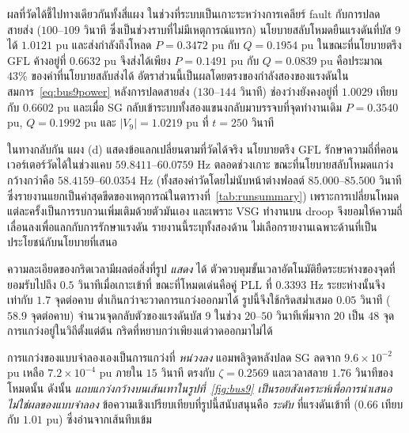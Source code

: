 \documentclass[12pt,a4paper]{article}
\begin{document}
ผลที่วัดได้ชี้ไปทางเดียวกันทั้งสี่แผง ในช่วงที่ระบบเป็นเกาะระหว่างการเคลียร์ fault กับการปลดสายส่ง ($100$--$109$ วินาที ซึ่งเป็นช่วงราบที่ไม่มีเหตุการณ์แทรก) นโยบายสลับโหมดยืนแรงดันที่บัส 9 ได้ $1.0121$ pu และส่งกำลังถึงโหลด $P=0.3472$ pu กับ $Q=0.1954$ pu ในขณะที่นโยบายตรึง GFL ค้างอยู่ที่ $0.6632$ pu จึงส่งได้เพียง $P=0.1491$ pu กับ $Q=0.0839$ pu คือประมาณ $43\%$ ของค่าที่นโยบายสลับส่งได้ อัตราส่วนนี้เป็นผลโดยตรงของกำลังสองของแรงดันในสมการ~\eqref{eq:bus9power} หลังการปลดสายส่ง ($130$--$144$ วินาที) ช่องว่างยังคงอยู่ที่ $1.0029$ เทียบกับ $0.6602$ pu และเมื่อ SG กลับเข้าระบบทั้งสองแขนงกลับมาบรรจบที่จุดทำงานเดิม $P=0.3540$ pu, $Q=0.1992$ pu และ $|V_9|=1.0219$ pu ที่ $t=250$ วินาที

ในทางกลับกัน แผง (d) แสดงข้อแลกเปลี่ยนตามที่วัดได้จริง นโยบายตรึง GFL รักษาความถี่ที่คอนเวอร์เตอร์วัดได้ในช่วงแคบ $59.8411$--$60.0759$ Hz ตลอดช่วงเกาะ ขณะที่นโยบายสลับโหมดแกว่งกว้างกว่าคือ $58.4159$--$60.0354$ Hz (ทั้งสองค่าวัดโดยไม่นับหน้าต่างฟอลต์ $85.000$--$85.500$ วินาที ซึ่งรายงานแยกเป็นค่าสุดขีดของเหตุการณ์ในตารางที่~\ref{tab:runsummary}) เพราะการเปลี่ยนโหมดแต่ละครั้งเป็นการรบกวนเพิ่มเติมด้วยตัวมันเอง และเพราะ VSG ทำงานบน droop จึงยอมให้ความถี่เลื่อนลงเพื่อแลกกับการรักษาแรงดัน รายงานนี้ระบุทั้งสองด้าน ไม่เลือกรายงานเฉพาะด้านที่เป็นประโยชน์กับนโยบายที่เสนอ


ความละเอียดของกริดเวลามีผลต่อสิ่งที่รูป \emph{แสดง} ได้ ตัวควบคุมขั้นเวลาอัตโนมัติยืดระยะห่างของจุดที่ยอมรับไปถึง $0.5$ วินาทีเมื่อเกาะเข้าที่ ขณะที่โหมดเด่นคือคู่ PLL ที่ $0.3393$ Hz ระยะห่างนั้นจึงเท่ากับ $1.7$ จุดต่อคาบ ต่ำเกินกว่าจะวาดการแกว่งออกมาได้ รูปนี้จึงใช้กริดสม่ำเสมอ $0.05$ วินาที ($58.9$ จุดต่อคาบ) จำนวนจุดกลับตัวของแรงดันบัส 9 ในช่วง $20$--$50$ วินาทีเพิ่มจาก $20$ เป็น $48$ จุด การแกว่งอยู่ในวิถีตั้งแต่ต้น กริดที่หยาบกว่าเพียงแต่วาดออกมาไม่ได้

การแกว่งของแบบจำลองเองเป็นการแกว่งที่ \emph{หน่วงลง} แอมพลิจูดหลังปลด SG ลดจาก $9.6\times10^{-2}$ pu เหลือ $7.2\times10^{-4}$ pu ภายใน $15$ วินาที ตรงกับ $\zeta=0.2569$ และเวลาสลาย $1.76$ วินาทีของโหมดนั้น ดังนั้น \emph{แถบแกว่งกว้างบนเส้นเทาในรูปที่~\ref{fig:bus9} เป็นรอยสังเคราะห์เพื่อการนำเสนอ ไม่ใช่ผลของแบบจำลอง} ข้อความเชิงเปรียบเทียบที่รูปนี้สนับสนุนคือ \emph{ระดับ} ที่แรงดันเข้าที่ ($0.66$ เทียบกับ $1.01$ pu) ซึ่งอ่านจากเส้นทึบเข้ม
\end{document}
